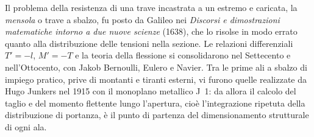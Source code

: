 \begin{notastorica}
Il problema della resistenza di una trave incastrata a un estremo e caricata, la
\emph{mensola} o trave a sbalzo, fu posto da Galileo nei \emph{Discorsi e dimostrazioni
matematiche intorno a due nuove scienze} (1638), che lo risolse in modo errato quanto
alla distribuzione delle tensioni nella sezione. Le relazioni differenziali
$T'=-l$, $M'=-T$ e la teoria della flessione si consolidarono nel Settecento e
nell'Ottocento, con Jakob Bernoulli, Eulero e Navier. Tra le prime ali a sbalzo di impiego pratico, prive di
montanti e tiranti esterni, vi furono quelle realizzate da Hugo Junkers nel 1915 con il monoplano
metallico J~1: da allora il calcolo del taglio e del momento flettente lungo l'apertura,
cioè l'integrazione ripetuta della distribuzione di portanza, è il punto di partenza del
dimensionamento strutturale di ogni ala.
\end{notastorica}
